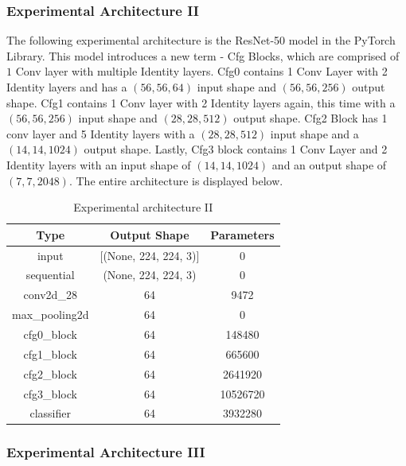 \documentclass{article}
\begin{document}
\subsubsection{Experimental Architecture II}
The following experimental architecture is the ResNet-50 model in the PyTorch Library.
This model introduces a new term - Cfg Blocks, which are comprised of $1$ Conv layer
with multiple Identity layers. Cfg0 contains 1 Conv Layer with 2 Identity layers
and has a $(56, 56, 64)$ input shape and $(56, 56, 256)$ output shape.
Cfg1 contains 1 Conv layer with 2 Identity layers again, this time with a 
$(56, 56, 256)$ input shape and $(28, 28, 512)$ output shape.
Cfg2 Block has 1 conv layer and 5 Identity layers with a $(28, 28, 512)$ input shape and
a $(14, 14, 1024)$ output shape. Lastly, Cfg3 block contains 1 Conv Layer and 2 Identity layers
with an input shape of $(14, 14, 1024)$ and an output shape of $(7, 7, 2048)$. The entire
architecture is displayed below.
\begin{table}[h!]
  \caption{Experimental architecture II}
  \label{tab:experimental_2}
  \centering
  \begin{tabular}{ccc}
    \toprule
    \textbf{Type} & \textbf{Output Shape} & Parameters \\ 
    \midrule
    input & [(None, 224, 224, 3)] & 0  \\ 
    sequential & (None, 224, 224, 3) & 0 \\ 
    conv2d\_28 & 64 & 9472\\
    max\_pooling2d & 64 & 0 \\ 
    cfg0\_block & 64 & 148480\\ 
    cfg1\_block & 64 & 665600 \\
    cfg2\_block & 64 & 2641920 \\ 
    cfg3\_block & 64 & 10526720  \\ 
    classifier & 64 & 3932280  \\
    \bottomrule
  \end{tabular}
\end{table}


\subsubsection{Experimental Architecture III}
\end{document}
